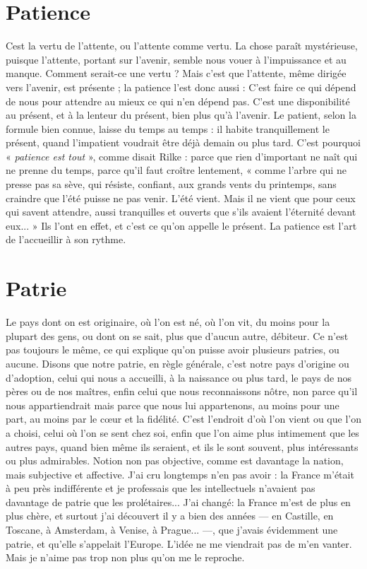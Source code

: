 \section{Patience}
Cest la vertu de l’attente, ou l’attente comme vertu. La chose
paraît mystérieuse, puisque l'attente, portant sur l'avenir, semble
nous vouer à l'impuissance et au manque. Comment serait-ce une vertu ? Mais
c'est que l'attente, même dirigée vers l'avenir, est présente ; la patience l’est donc
aussi : C’est faire ce qui dépend de nous pour attendre au mieux ce qui n'en
dépend pas. C’est une disponibilité au présent, et à la lenteur du présent, bien
plus qu’à l'avenir. Le patient, selon la formule bien connue, laisse du temps au
temps : il habite tranquillement le présent, quand l’impatient voudrait être déjà
demain ou plus tard. C’est pourquoi « {\it patience est tout} », comme disait Rilke :
parce que rien d’important ne naît qui ne prenne du temps, parce qu'il faut
croître lentement, « comme l'arbre qui ne presse pas sa sève, qui résiste, confiant,
aux grands vents du printemps, sans craindre que l’été puisse ne pas venir. L'été
vient. Mais il ne vient que pour ceux qui savent attendre, aussi tranquilles et
ouverts que s’ils avaient l'éternité devant eux... » Ils l'ont en effet, et c'est ce
qu’on appelle le présent. La patience est l’art de l’accueillir à son rythme.

\section{Patrie}
Le pays dont on est originaire, où l’on est né, où l’on vit, du moins
pour la plupart des gens, ou dont on se sait, plus que d’aucun
autre, débiteur. Ce n’est pas toujours le même, ce qui explique qu’on puisse
avoir plusieurs patries, ou aucune. Disons que notre patrie, en règle générale,
c'est notre pays d’origine ou d’adoption, celui qui nous a accueilli, à la naissance
ou plus tard, le pays de nos pères ou de nos maîtres, enfin celui que nous
reconnaissons nôtre, non parce qu’il nous appartiendrait mais parce que nous
lui appartenons, au moins pour une part, au moins par le cœur et la fidélité.
C’est l'endroit d’où l’on vient ou que l’on a choisi, celui où l’on se sent chez soi,
enfin que l’on aime plus intimement que les autres pays, quand bien même ils
seraient, et ils le sont souvent, plus intéressants ou plus admirables. Notion non
pas objective, comme est davantage la nation, mais subjective et affective. J'ai
cru longtemps n’en pas avoir : la France m'était à peu près indifférente et je
professais que les intellectuels n’avaient pas davantage de patrie que les prolétaires...
J'ai changé: la France m’est de plus en plus chère, et surtout j'ai
découvert il y a bien des années — en Castille, en Toscane, à Amsterdam, à
Venise, à Prague... —, que j'avais évidemment une patrie, et qu’elle s'appelait
l'Europe. L'idée ne me viendrait pas de m’en vanter. Mais je n'aime pas trop
non plus qu’on me le reproche.

